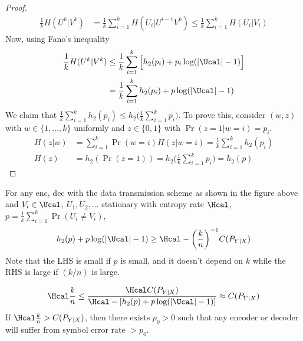 \begin{proof}
\begin{align*}
    \frac{1}k H(U^k|V^k) &= \frac{1}{k} \sum_{i=1}^k H(U_i|U^{i-1} V^k) 
    \leq \frac{1}{k} \sum_{i=1}^k H(U_i|V_i)
\end{align*}
Now, using Fano's inequality
\begin{align*}
    \frac{1}k H(U^k|V^k) &\leq \frac{1}{k} \sum_{i=1}^k\Big[ h_2(p_i) + p_i\log(|\Ucal|-1)\Big]\\
    &= \frac1k \sum_{i=1}^k h_2(p_i) + p\log(|\Ucal|-1)
\end{align*}
We claim that $\frac1k \sum_{i=1}^k h_2(p_i) \leq h_2\bigg(\frac1k \sum_{i=1}^k p_i\bigg)$. To prove this, consider $(w,z)$ with $w \in \{1, \dots, k\}$ uniformly and $z \in \{0,1\}$ with $\Pr(z=1|w=i) = p_i$.
\begin{align*}
    H(z|w) &= \sum_{i=1}^k \Pr(w=i)H(z|w=i) = \frac{1}{k} \sum_{i=1}^k h_2(p_i) \\
    H(z) &= h_2(\Pr(z=1)) = h_2\bigg(\frac1k \sum_{i=1}^k p_i\bigg) = h_2(p)
\end{align*}
\end{proof}
\begin{theorem}
For any enc, dec with the data transmission scheme as shown in the figure above and $V_i \in \Ucal$, $U_1, U_2, \dots$ stationary with entropy rate $\Hcal$, $p = \frac1k \sum_{i=1}^k \Pr(U_i \neq V_i)$,
\[h_2(p) + p\log(|\Ucal| - 1) \geq \Hcal - \bigg(\frac kn\bigg)^{-1} C(P_{Y|X})\]
Note that the LHS is small if $p$ is small, and it doesn't depend on $k$ while the RHS is large if $(k/n)$ is large.
\end{theorem}
\begin{remark}
\[\Hcal \frac{k}{n} \leq \frac{\Hcal C(P_{Y|X})}{\Hcal - [h_2(p) + p\log(|\Ucal| - 1)]} \approx C(P_{Y|X})\]
If $\Hcal \frac kn > C(P_{Y|X})$, then there exists $p_0 > 0$ such that any encoder or decoder will suffer from symbol error rate $> p_0$.
\end{remark}


